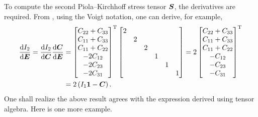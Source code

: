 To compute the second Piola--Kirchhoff stress tensor $\bm{S}$, the derivatives are required.
From , using the Voigt notation, one can derive, for example,
\begin{gather}
\begin{split}
    \dfrac{\mathrm{d}I_2}{\mathrm{d}\bm{E}}=\dfrac{\mathrm{d}I_2}{\mathrm{d}\bm{C}}\dfrac{\mathrm{d}\bm{C}}{\mathrm{d}\bm{E}}&=\begin{bmatrix}
        C_{22}+C_{33} \\
        C_{11}+C_{33} \\
        C_{11}+C_{22} \\
        -2C_{12}      \\
        -2C_{23}      \\
        -2C_{31}
    \end{bmatrix}^{\mathrm{T}}\begin{bmatrix}
        2 &   &   &   &   &   \\
          & 2 &   &   &   &   \\
          &   & 2 &   &   &   \\
          &   &   & 1 &   &   \\
          &   &   &   & 1 &   \\
          &   &   &   &   & 1
    \end{bmatrix}=2\begin{bmatrix}
        C_{22}+C_{33} \\
        C_{11}+C_{33} \\
        C_{11}+C_{22} \\
        -C_{12}       \\
        -C_{23}       \\
        -C_{31}
    \end{bmatrix}^{\mathrm{T}}\\&=2\left(I_1\bm{1}-\bm{C}\right).
\end{split}
\end{gather}
One shall realize the above result agrees with the expression derived using tensor algebra.
Here is one more example.
